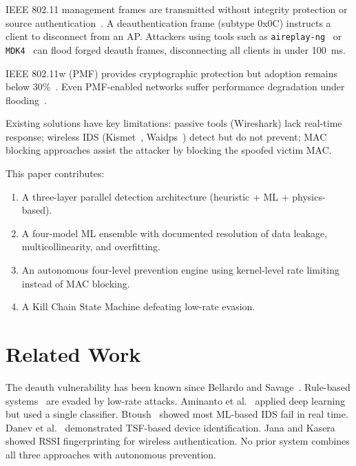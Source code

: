 \documentclass[conference]{IEEEtran}
\begin{document}
IEEE 802.11 management frames are transmitted without integrity protection or source authentication~\cite{ieee80211}. A deauthentication frame (subtype 0x0C) instructs a client to disconnect from an AP. Attackers using tools such as \texttt{aireplay-ng}~\cite{aireplayng} or \texttt{MDK4}~\cite{mdk4} can flood forged deauth frames, disconnecting all clients in under 100~ms.

IEEE 802.11w (PMF) provides cryptographic protection but adoption remains below 30\%~\cite{wpa3spec}. Even PMF-enabled networks suffer performance degradation under flooding~\cite{vanhoef2017}.

Existing solutions have key limitations: passive tools (Wireshark) lack real-time response; wireless IDS (Kismet~\cite{kismet}, Waidps~\cite{waidps}) detect but do not prevent; MAC blocking approaches assist the attacker by blocking the spoofed victim MAC.

This paper contributes:
\begin{enumerate}
    \item A three-layer parallel detection architecture (heuristic + ML + physics-based).
    \item A four-model ML ensemble with documented resolution of data leakage, multicollinearity, and overfitting.
    \item An autonomous four-level prevention engine using kernel-level rate limiting instead of MAC blocking.
    \item A Kill Chain State Machine defeating low-rate evasion.
\end{enumerate}

\section{Related Work}

The deauth vulnerability has been known since Bellardo and Savage~\cite{bellardo2003}. Rule-based systems~\cite{arbaugh2002} are evaded by low-rate attacks. Aminanto et al.~\cite{aminanto2018} applied deep learning but used a single classifier. Btoush~\cite{btoush2024} showed most ML-based IDS fail in real time. Danev et al.~\cite{danev2012} demonstrated TSF-based device identification. Jana and Kasera~\cite{jana2010} showed RSSI fingerprinting for wireless authentication. No prior system combines all three approaches with autonomous prevention.
\end{document}
